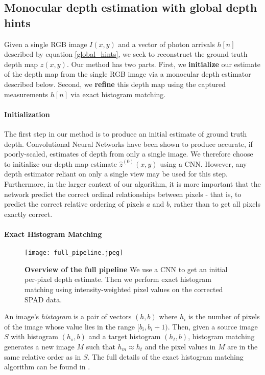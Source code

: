 \subsection{Monocular depth estimation with global depth hints}
Given a single RGB image $I(x,y)$ and a vector of photon arrivals $h[n]$
described by equation \ref{global_hints}, we seek to
reconstruct the ground truth depth map $z(x,y)$.
Our method has two parts. First, we \textbf{initialize} our estimate of the depth map from the single RGB
image via a monocular depth estimator described below. Second, we \textbf{refine} this depth map using
the captured measurements $h[n]$ via exact histogram matching. 

\paragraph{Initialization}
The first step in our method is to produce an initial estimate of ground truth
depth. Convolutional Neural Networks have been shown to produce accurate, if poorly-scaled, estimates of depth
from only a single image. We therefore choose to initialize our depth map
estimate $\hat z^{(0)}(x,y)$ using
a CNN. However, any depth estimator reliant on only a single
view may be used for this step. Furthermore, in the larger context of our
algorithm, it is more important that the network predict the correct ordinal
relationships between pixels - that is, to predict the correct relative ordering
of pixels $a$ and $b$, rather than to get all pixels exactly correct.

\paragraph{Exact Histogram Matching}
\begin{figure*}
  \centering
  \texttt{[image: full\_pipeline.jpeg]}
  \caption{\textbf{Overview of the full pipeline} We use a CNN to get an initial
  per-pixel depth estimate. Then we perform exact histogram matching using
  intensity-weighted pixel values on the corrected SPAD data.}
\end{figure*}
An image's \textit{histogram} is a pair of vectors $(h, b)$ where $h_i$ is the number of
pixels of the image whose value lies in the range $[b_i, b_i+1)$.
Then, given a source image $S$ with histogram $(h_s, b)$ and a target histogram
$(h_t, b)$, histogram matching generates a new image $M$ such that $h_m \approx
h_t$ and the pixel values in $M$ are in the same relative order as in $S$.
The full details of the exact histogram matching algorithm can be found in
\cite{Morovic2002}.

